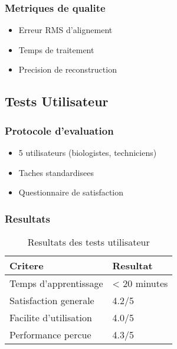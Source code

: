 \documentclass[12pt,a4paper]{article}
\begin{document}
\subsubsection{Metriques de qualite}
\begin{itemize}
\item Erreur RMS d'alignement
\item Temps de traitement
\item Precision de reconstruction
\end{itemize}

\subsection{Tests Utilisateur}

\subsubsection{Protocole d'evaluation}
\begin{itemize}
\item 5 utilisateurs (biologistes, techniciens)
\item Taches standardisees
\item Questionnaire de satisfaction
\end{itemize}

\subsubsection{Resultats}
\begin{table}[h]
\centering
\begin{tabular}{|p{6cm}|p{4cm}|}
\hline
\textbf{Critere} & \textbf{Resultat} \\
\hline
Temps d'apprentissage & < 20 minutes \\
\hline
Satisfaction generale & 4.2/5 \\
\hline
Facilite d'utilisation & 4.0/5 \\
\hline
Performance percue & 4.3/5 \\
\hline
\end{tabular}
\caption{Resultats des tests utilisateur}
\end{table}
\end{document}
